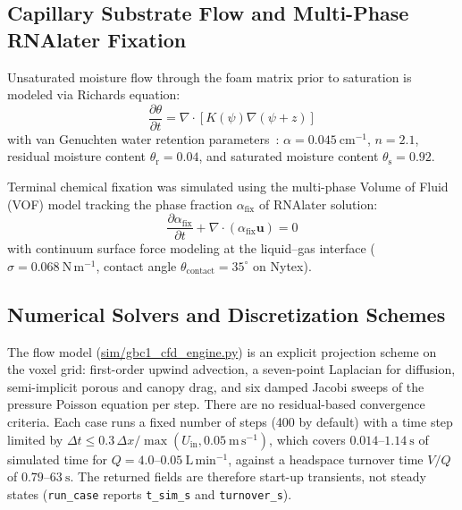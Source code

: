 \documentclass[pdflatex,sn-nature,iicol]{sn-jnl}
\begin{document}
\subsection{Capillary Substrate Flow and Multi-Phase RNAlater Fixation}\label{sec:richards_vof_meth}

Unsaturated moisture flow through the foam matrix prior to saturation is modeled via Richards equation:
\begin{equation}
\frac{\partial \theta}{\partial t} = \nabla \cdot \left[ K(\psi) \nabla (\psi + z) \right]
\label{eq:richards}
\end{equation}
with van Genuchten water retention parameters~\cite{vangenuchten1980closed}: $\alpha = 0.045\ \mathrm{cm^{-1}}$, $n = 2.1$, residual moisture content $\theta_{\mathrm{r}} = 0.04$, and saturated moisture content $\theta_{\mathrm{s}} = 0.92$.

Terminal chemical fixation was simulated using the multi-phase Volume of Fluid (VOF) model tracking the phase fraction $\alpha_{\mathrm{fix}}$ of RNAlater solution:
\begin{equation}
\frac{\partial \alpha_{\mathrm{fix}}}{\partial t} + \nabla \cdot (\alpha_{\mathrm{fix}} \mathbf{u}) = 0
\label{eq:vof}
\end{equation}
with continuum surface force modeling at the liquid--gas interface ($\sigma = 0.068\ \mathrm{N\,m^{-1}}$, contact angle $\theta_{\mathrm{contact}} = 35^\circ$ on Nytex).

\subsection{Numerical Solvers and Discretization Schemes}\label{sec:solvers_meth}

The flow model (\url{sim/gbc1_cfd_engine.py}) is an explicit projection scheme on the voxel grid: first-order upwind advection, a seven-point Laplacian for diffusion, semi-implicit porous and canopy drag, and six damped Jacobi sweeps of the pressure Poisson equation per step. There are no residual-based convergence criteria. Each case runs a fixed number of steps (400 by default) with a time step limited by $\Delta t \le 0.3\,\Delta x / \max(U_{\mathrm{in}}, 0.05\ \mathrm{m\,s^{-1}})$, which covers $0.014$--$1.14\ \mathrm{s}$ of simulated time for $Q = 4.0$--$0.05\ \mathrm{L\,min^{-1}}$, against a headspace turnover time $V/Q$ of $0.79$--$63\ \mathrm{s}$. The returned fields are therefore start-up transients, not steady states (\texttt{run\_case} reports \texttt{t\_sim\_s} and \texttt{turnover\_s}).
\end{document}
